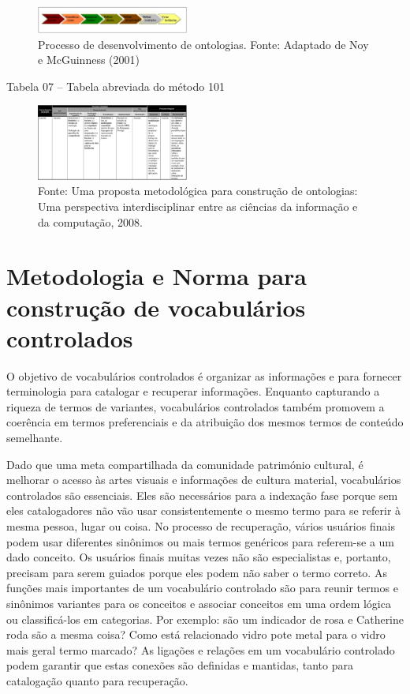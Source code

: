 \documentclass[a4paper]{report}
\begin{document}
\begin{figure}[h] 
\centering %
\includegraphics[width=5cm]{Figuras/11.png} %
\caption{Processo de desenvolvimento de ontologias.
Fonte: Adaptado de Noy e McGuinness (2001)}
\end{figure}

Tabela 07 – Tabela abreviada do método 101

\begin{figure}[h] 
\centering %
\includegraphics[width=5cm]{Figuras/12.png} %
\caption{Fonte: Uma proposta metodológica para construção de ontologias: Uma perspectiva interdisciplinar entre as ciências da informação e da computação, 2008.}
\end{figure}

\section{Metodologia e Norma para construção de vocabulários controlados} 
\qquad O objetivo de vocabulários controlados é organizar as informações e
para fornecer terminologia para catalogar e recuperar informações. Enquanto
capturando a riqueza de termos de variantes, vocabulários controlados também
promovem a coerência em termos preferenciais e da atribuição dos mesmos termos de conteúdo semelhante.
	
	Dado que uma meta compartilhada da comunidade património cultural,
é melhorar o acesso às artes visuais e informações de cultura material,
vocabulários controlados são essenciais. Eles são necessários para a indexação
fase porque sem eles catalogadores não vão usar consistentemente o mesmo
termo para se referir à mesma pessoa, lugar ou coisa. No processo de recuperação,
vários usuários finais podem usar diferentes sinônimos ou mais termos genéricos para
referem-se a um dado conceito. Os usuários finais muitas vezes não são especialistas e, portanto, precisam para serem guiados porque eles podem não saber o termo correto.
	As funções mais importantes de um vocabulário controlado são para reunir termos e sinônimos variantes para os conceitos e associar conceitos em uma ordem lógica ou classificá-los em categorias. Por exemplo: são um indicador de rosa e Catherine roda são a mesma coisa? Como está relacionado vidro pote metal para o vidro mais geral termo marcado? As ligações e relações em um vocabulário controlado podem garantir que estas conexões são definidas e mantidas, tanto para catalogação quanto para recuperação.
\end{document}
